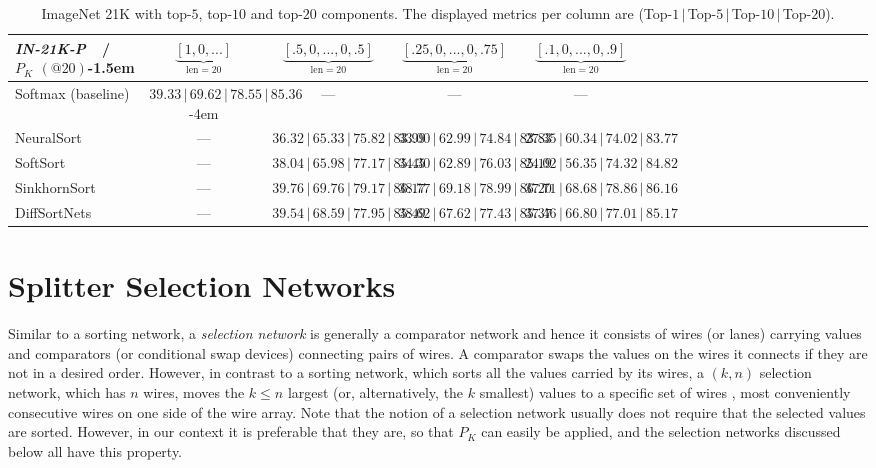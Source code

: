 \documentclass{article}
\begin{document}
\begin{table*}[h]
{\begin{tabular}{lcccccccccccccccccccc}
\bottomrule
\toprule
\textit{IN-21K-P}~~/~~$P_K$ $(@20)$\kern-1.5em  &  $\underbrace{[1,0,...]}_{\text{len}=20}$  &  $\underbrace{[.5,0,...,0,.5]}_{\text{len}=20}$  &  $\underbrace{[.25,0,...,0,.75]}_{\text{len}=20}$   &  $\underbrace{[.1,0,...,0,.9]}_{\text{len}=20}$ \\
\midrule
Softmax   (baseline)                         &  $39.33\,|\,69.62\,|\,78.55\,|\,85.36$\kern-4em  &  ---  &  ---  &  ---\\
NeuralSort      &  ---  &  $36.32\,|\,65.33\,|\,75.82\,|\,83.99$  &  $33.00\,|\,62.99\,|\,74.84\,|\,83.83$  &  $27.35\,|\,60.34\,|\,74.02\,|\,83.77$\\
SoftSort           &  ---  &  $38.04\,|\,65.98\,|\,77.17\,|\,85.45$  &  $34.30\,|\,62.89\,|\,76.03\,|\,85.19$  &  $24.02\,|\,56.35\,|\,74.32\,|\,84.82$\\
SinkhornSort     &  ---  &  $39.76\,|\,69.76\,|\,79.17\,|\,86.17$  &  $38.77\,|\,69.18\,|\,78.99\,|\,86.20$  &  $37.71\,|\,68.68\,|\,78.86\,|\,86.16$\\
DiffSortNets    &  ---  &  $39.54\,|\,68.59\,|\,77.95\,|\,85.49$  &  $38.62\,|\,67.62\,|\,77.43\,|\,85.37$  &  $37.46\,|\,66.80\,|\,77.01\,|\,85.17$\\
\bottomrule
    \end{tabular}
    }
    \caption{ImageNet 21K with top-$5$, top-$10$ and top-$20$ components.
    The displayed metrics per column are (Top-$1\,|\,$Top-$5\,|\,$Top-$10\,|\,$Top-$20$).
    }
    \label{tab:imagenet-21k-p-top-10-top-20}
\end{table*}



\section{Splitter Selection Networks}
\label{apx:ssn}

Similar to a sorting network, a \emph{selection network} is generally
a comparator network and hence it consists of wires (or lanes) carrying
values and comparators (or conditional swap devices) connecting pairs
of wires. A comparator swaps the values on the wires it connects if they
are not in a desired order. However, in contrast to a sorting network,
which sorts all the values carried by its wires, a $(k,n)$ selection
network, which has $n$ wires, moves the $k \le n$ largest (or, alternatively,
the $k$ smallest) values to a specific set of wires \citep{Knuth1998-3-SortingSearching},
most conveniently consecutive wires on one side of the wire array.
Note that the notion of a selection network usually does not require
that the selected values are sorted. However, in our context it is
preferable that they are, so that $P_K$ can easily be applied, and
the selection networks discussed below all have this property.
\end{document}
